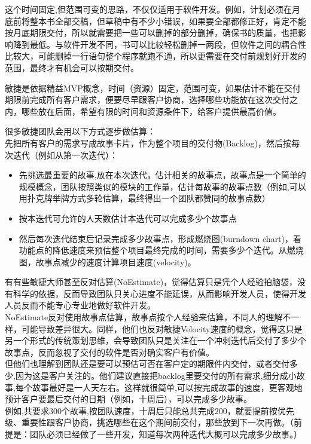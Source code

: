 这个时间固定,但范围可变的思路，不仅仅适用于软件开发。例如，计划必须在月底前将整本书全部交稿，但草稿中有不少小错误，如果要全部都修正好，肯定不能按月底期限交付，所以就需要把一些可以删掉的部分删掉，确保书的质量，也把影响降到最低。与软件开发不同，书可以比较轻松删掉一两段，但软件之间的耦合性比较大，可能删掉一行语句整个程序就跑不通，所以更需要在交付前规划好开发的范围，最终才有机会可以按期交付。

敏捷是依据精益MVP概念，时间（资源）固定，范围可变，如果估计不能在交付期限前完成所有客户需求，便要尽早跟客户协商，选择哪些功能放在这次交付之内，哪些放在后面，希望有限的时间和资源条件下，给客户提供最高价值。

很多敏捷团队会用以下方式逐步做估算：\\
先把所有客户的需求写成故事卡片，作为整个项目的交付物(Backlog)，然后按每次迭代（例如从第一次迭代）：\\

\begin{itemize}
\tightlist
\item
  先挑选最重要的故事,放在本次迭代，估计相关的故事点，故事点是一个简单的规模概念，团队按照类似的模块的工作量，估计每故事的故事点数（例如,可以用扑克牌举牌方式多轮估算，最终得出一个团队都赞同的故事点数）
\item
  按本迭代可允许的人天数估计本迭代可以完成多少个故事点
\item
  然后每次迭代结束后记录完成多少故事点，形成燃烧图(burndown
  chart)，看功能点的降低速度来预估整个项目最终完成的时间，需要多少个迭代。从燃烧图，故事点减少的速度计算项目速度(velocity)。
\end{itemize}

\begin{description}
\item[]
\begin{description}
\tightlist
\item[]
+ + +
\end{description}
\end{description}

有有些敏捷大师甚至反对估算(NoEstimate)，觉得估算只是凭个人经验拍脑袋，没有科学的依据，反而导致团队只关心进度不能延误，从而影响开发人员，使得开发人员反而不能专心专业地做好软件开发。\\
NoEstimate反对使用故事点估算，故事点按个人经验来估算，不同人的理解不一样，可能导致差异很大。同样，他们也反对敏捷Velocity速度的概念，觉得这只是另一个形式的传统策划思维，会导致团队只是关注在一个冲刺迭代后交付了多少个故事点，反而忽视了交付的软件是否对确实客户有价值。\\
但他们也理解到团队还是要可以预估可否在客户定的期限件内交付，或者交付多少,因为这是客户关注的。他们建议直接把backlog里要交付的所有需求,细分成小故事,每个故事最好是一人天左右。这样就很简单,可以按完成故事的速度，更客观地预计客户要最后交付的日期（例如，十周后），可以完成多少故事。\\
例如,共要求300个故事,按团队速度，十周后只能总共完成200，就要提前按优先级、重要性跟客户协商，挑选哪些在这个期间前交付，那些放到下一次再做。（前提是：团队必须已经做了一些开发，知道每次两种迭代大概可以完成多少故事。）

